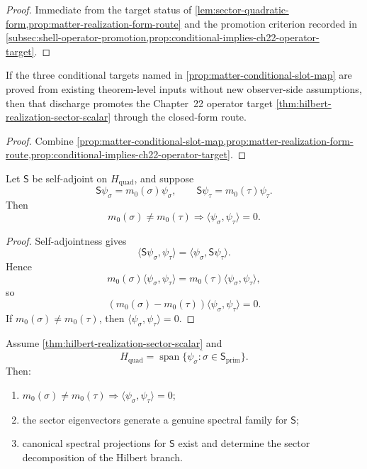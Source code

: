 \begin{proof}
Immediate from the target status of
\cref{lem:sector-quadratic-form,prop:matter-realization-form-route}
and the promotion criterion recorded in
\cref{subsec:shell-operator-promotion,prop:conditional-implies-ch22-operator-target}.
\end{proof}

\begin{corollary}
\label{cor:matter-promotion-checklist-to-operator-target}
If the three conditional targets named in
\cref{prop:matter-conditional-slot-map}
are proved from existing theorem-level inputs without new
observer-side assumptions, then that discharge promotes the
Chapter~22 operator target
\cref{thm:hilbert-realization-sector-scalar}
through the closed-form route.
\end{corollary}

\begin{proof}
Combine
\cref{prop:matter-conditional-slot-map,prop:matter-realization-form-route,prop:conditional-implies-ch22-operator-target}.
\end{proof}

\begin{lemma}
\label{lem:matter-realization-sector-orthogonality}
Let \(\mathsf S\) be self-adjoint on \(H_{\mathrm{quad}}\), and suppose
\[
  \mathsf S\psi_\sigma = m_0(\sigma)\psi_\sigma,
  \qquad
  \mathsf S\psi_\tau = m_0(\tau)\psi_\tau.
\]
Then
\[
  m_0(\sigma)\neq m_0(\tau)
  \Longrightarrow
  \langle\psi_\sigma,\psi_\tau\rangle=0.
\]
\end{lemma}

\begin{proof}
Self-adjointness gives
\[
  \langle \mathsf S\psi_\sigma,\psi_\tau\rangle
  =
  \langle \psi_\sigma,\mathsf S\psi_\tau\rangle.
\]
Hence
\[
  m_0(\sigma)\langle\psi_\sigma,\psi_\tau\rangle
  =
  m_0(\tau)\langle\psi_\sigma,\psi_\tau\rangle,
\]
so
\[
  (m_0(\sigma)-m_0(\tau))\langle\psi_\sigma,\psi_\tau\rangle=0.
\]
If \(m_0(\sigma)\neq m_0(\tau)\), then
\(\langle\psi_\sigma,\psi_\tau\rangle=0\).
\end{proof}

\begin{corollary}
\label{cor:matter-realization-sector-observable-consequences}
Assume \cref{thm:hilbert-realization-sector-scalar} and
\[
  H_{\mathrm{quad}}=
  \overline{\operatorname{span}\{\psi_\sigma:
  \sigma\in\mathsf S_{\mathrm{prim}}\}}.
\]
Then:
\begin{enumerate}[label=\textup{(\roman*)}]
\item
      \(m_0(\sigma)\neq m_0(\tau)
      \Rightarrow \langle\psi_\sigma,\psi_\tau\rangle=0\);
\item
      the sector eigenvectors generate a genuine spectral family for
      \(\mathsf S\);
\item
      canonical spectral projections for \(\mathsf S\) exist and determine
      the sector decomposition of the Hilbert branch.
\end{enumerate}
\end{corollary}

